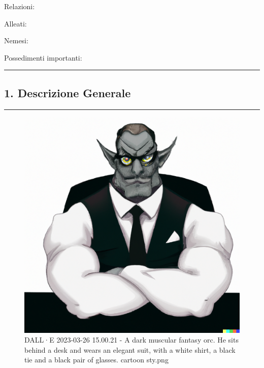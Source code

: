 Relazioni:

Alleati:

Nemesi:

Possedimenti importanti:

\begin{center}\rule{0.5\linewidth}{0.5pt}\end{center}

\subsection{1. Descrizione Generale}\label{descrizione-generale}

\begin{center}\rule{0.5\linewidth}{0.5pt}\end{center}

\begin{figure}
\centering
\includegraphics{DALLE_2023-03-26_15.00.21_-_A_dark_muscular_fantasy_orc._He_sits_behind_a_desk_and_wears_an_elegant_suit_with_a_white_shirt_a_black_tie_and_a_black_pair_of_glasses._cartoon_sty.png}
\caption{DALL·E 2023-03-26 15.00.21 - A dark muscular fantasy orc. He
sits behind a desk and wears an elegant suit, with a white shirt, a
black tie and a black pair of glasses. cartoon sty.png}
\end{figure}

